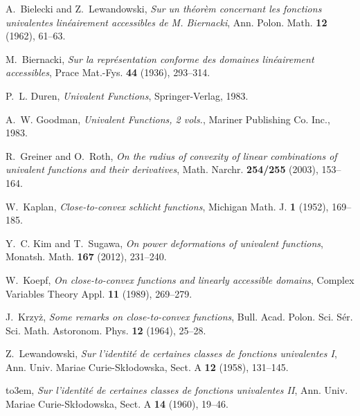 \documentclass[a4paper,12pt]{amsart}
\numberwithin{equation}{section}
\theoremstyle{definition}
\begin{document}
  
\providecommand{\bysame}{\leavevmode\hbox to3em{\hrulefill}\thinspace}
\providecommand{\MR}{\relax\ifhmode\unskip\space\fi MR }
\providecommand{\MRhref}[2]{  \href{http://www.ams.org/mathscinet-getitem?mr=#1}{#2}
}
\providecommand{\href}[2]{#2}
\begin{thebibliography}{10}

A.~Bielecki and Z.~Lewandowski, \emph{Sur un th\'eor\`em concernant les
  fonctions univalentes lin\'eairement accessibles de {M}. {B}iernacki}, Ann.
  Polon. Math. \textbf{12} (1962), 61--63.

M.~Biernacki, \emph{Sur la repr\'esentation conforme des domaines
  lin\'eairement accessibles}, Prace Mat.-Fys. \textbf{44} (1936), 293--314.

P.~L. Duren, \emph{Univalent {F}unctions}, Springer-Verlag, 1983.

A.~W. Goodman, \emph{Univalent {F}unctions, 2 vols.}, Mariner Publishing Co.
  Inc., 1983.

R.~Greiner and O.~Roth, \emph{On the radius of convexity of linear combinations
  of univalent functions and their derivatives}, Math. Narchr. \textbf{254/255}
  (2003), 153--164.

W.~Kaplan, \emph{Close-to-convex schlicht functions}, Michigan Math. J.
  \textbf{1} (1952), 169--185.

Y.~C. Kim and T.~Sugawa, \emph{On power deformations of univalent functions},
  Monatsh. Math. \textbf{167} (2012), 231--240.

W.~Koepf, \emph{On close-to-convex functions and linearly accessible domains},
  Complex Variables Theory Appl. \textbf{11} (1989), 269--279.

J.~Krzy{\.z}, \emph{Some remarks on close-to-convex functions}, Bull. Acad.
  Polon. Sci. S\'er. Sci. Math. Astoronom. Phys. \textbf{12} (1964), 25--28.

Z.~Lewandowski, \emph{Sur l'identit\'e de certaines classes de fonctions
  univalentes {{\rm I}}}, Ann. Univ. Mariae Curie-Sk\l odowska, Sect. A
  \textbf{12} (1958), 131--145.

\bysame, \emph{Sur l'identit\'e de certaines classes de fonctions univalentes
  {{\rm II}}}, Ann. Univ. Mariae Curie-Sk\l odowska, Sect. A \textbf{14}
  (1960), 19--46.

\end{thebibliography}
\end{document}
